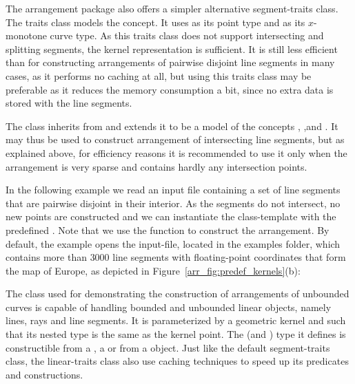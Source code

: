 
The arrangement package also offers a simpler alternative
segment-traits class. The traits class
 models 
the  concept. It uses
 as its point type and
 as its $x$-monotone curve type. As this
traits class does not support intersecting and splitting segments,
the kernel representation is sufficient. It is still less
efficient than  for constructing
arrangements of pairwise disjoint line segments in many cases, as
it performs no caching at all, but using this traits class may be
preferable as it reduces the memory consumption a bit, since no extra
data is stored with the line segments.

The class  inherits
from  and
extends it to be a model of the concepts ,
,and
. It may thus be used to
construct arrangement of intersecting line segments, but as explained
above, for efficiency reasons it is recommended to use it only when
the arrangement is very sparse and contains hardly any intersection
points.

In the following example we read an input file containing a set of
line segments that are pairwise disjoint in their interior. As the
segments do not intersect, no new points are constructed and we can
instantiate the 
class-template with the predefined
. Note that we use
the  function to construct the
arrangement.
By default, the example opens the  input-file,
located in the examples folder, which contains more than $3000$ line segments
with floating-point coordinates that form the map of Europe, as depicted in
Figure~\ref{arr_fig:predef_kernels}(b):


The  class used for demonstrating the
construction of arrangements of unbounded curves is capable of handling
bounded and unbounded linear objects, namely lines, rays and line
segments. It is parameterized by a geometric kernel and such that
its nested  type is the same as the kernel point. The
 (and ) type it defines is
constructible from a , a  or
from a  object. Just like the default
segment-traits class, the linear-traits class also use caching
techniques to speed up its predicates and constructions.

